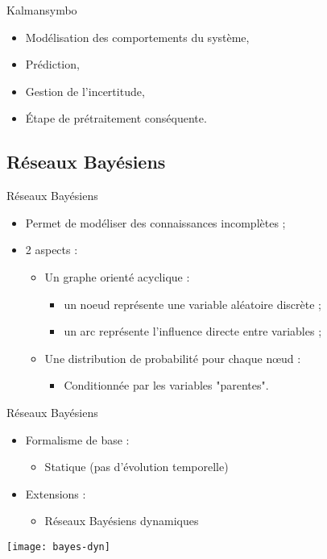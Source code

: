 \documentclass[compress]{beamer}
\begin{document}
\begin{frame}{Kalmansymbo}
\begin{itemize}
\item Modélisation des comportements du système,
\item Prédiction,
\item Gestion de l'incertitude,
\item \'Etape de prétraitement conséquente.
\end{itemize}
\end{frame}

\subsection{Réseaux Bayésiens}

\begin{frame}{Réseaux Bayésiens}
\begin{itemize}
\item Permet de modéliser des connaissances incomplètes ;
\item 2 aspects :
	\begin{itemize}
	\item Un graphe orienté acyclique :
		\begin{itemize}
		\item un noeud représente une variable aléatoire discrète ;
		\item un arc représente l'influence directe entre variables ;
		\end{itemize}
	\item Une distribution de probabilité pour chaque nœud :
		\begin{itemize}
		\item Conditionnée par les variables "parentes".
		\end{itemize}
	\end{itemize}
\end{itemize}
\end{frame}

\begin{frame}{Réseaux Bayésiens}
\begin{itemize}
\item Formalisme de base :
	\begin{itemize}
	\item Statique (pas d'évolution temporelle)
	\end{itemize}
\item Extensions :
	\begin{itemize}
	\item Réseaux Bayésiens dynamiques
	\end{itemize}
\end{itemize}
\begin{center}
	\texttt{[image: bayes-dyn]}
\end{center}
\end{frame}
\end{document}
